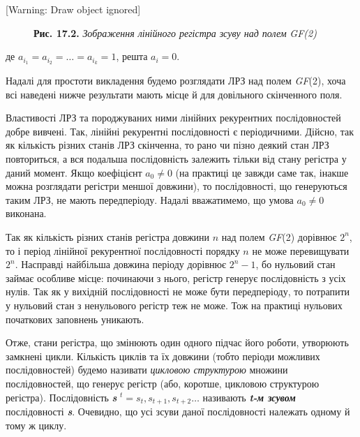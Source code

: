 \bigskip

[Warning: Draw object ignored]


\bigskip


\bigskip


\bigskip


\bigskip


\bigskip



\begin{figure}
\centering
\begin{minipage}{5.1425in}
\textbf{Рис. 17.2.}\textbf{\textit{ }}\textit{Зображення лінійного регістра
зсуву над полем}\textbf{\textit{ }}\textit{GF}\textit{(2)}
\end{minipage}
\end{figure}

\bigskip


\bigskip

де  ${a_{{i_{{1}}}}=a_{i_{{2}}}{=\dots=a_{i_{{k}}}}{=1}}$,
решта  ${a_{{i}}=0}$.

Надалі для простоти викладення будемо розглядати ЛРЗ над полем \textit{GF}(2),
хоча всі наведені нижче результати мають місце й для довільного скінченного
поля.

Властивості ЛРЗ та породжуваних ними лінійних рекурентних послідовностей добре
вивчені. Так, лінійні рекурентні послідовності є періодичними. Дійсно, так як
кількість різних станів ЛРЗ скінченна, то рано чи пізно деякий стан ЛРЗ
повториться, а вся подальша послідовність залежить тільки від  стану регістра у
даний момент. Якщо коефіцієнт  ${a_{{0}}\neq 0}$ (на практиці це завжди саме
так, інакше можна розглядати регістри меншої довжини), то послідовності, що
генеруються таким ЛРЗ, не мають передперіоду. Надалі вважатимемо, що умова 
${a_{{0}}\neq 0}$ виконана. 

Так як кількість різних станів регістра довжини  ${n}$ над полем \textit{GF}(2)
дорівнює  ${2^{{n}}}$, то і період лінійної рекурентної послідовності порядку 
${n}$ не може перевищувати  ${2^{{n}}}$. Насправді найбільша довжина періоду
дорівнює  ${2^{{n}}-1}$, бо нульовий стан займає особливе місце: починаючи з
нього, регістр генерує послідовність з усіх нулів. Так як у вихідній
послідовності не може бути передперіоду, то потрапити у нульовий стан з
ненульового регістр теж не може. Тож на практиці нульових початкових заповнень
уникають. 

Отже, стани регістра, що змінюють один одного підчас його роботи, утворюють
замкнені цикли. Кількість циклів та їх довжини (тобто періоди можливих
послідовностей) будемо називати \textit{цикловою структурою}\textbf{ }множини
послідовностей, що генерує регістр (або, коротше, цикловою структурою
регістра). Послідовність \textbf{\textit{s}}
${{}^{{t}}=s_{{t}},s_{{t+1}},s_{{t+2}}\dots}$ називають
\textbf{\textit{t}}\textbf{\textit{{}-м зсувом}} послідовності\textbf{
}\textbf{\textit{s}}. Очевидно, що усі зсуви даної послідовності належать
одному й тому ж циклу.



